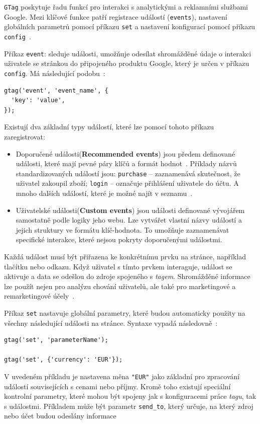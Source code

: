 \bigskip
\texttt{GTag} poskytuje řadu funkcí pro interakci s analytickými a reklamními službami Google. Mezi klíčové funkce patří registrace událostí (\texttt{events}), nastavení globálních parametrů pomocí příkazu \texttt{set} a nastavení konfigurací pomocí příkazu \texttt{config}~\cite{idGoogle}. 

\bigskip
Příkaz \texttt{event}: sleduje události, umožňuje odesílat shromážděné údaje o interakci uživatele se stránkou do připojeného produktu Google, který je určen v příkazu \texttt{config}. Má následující podobu~\cite{idGoogle}:
\begin{lstlisting}[caption=Event command]
gtag('event', 'event_name', {
  'key': 'value',
});
\end{lstlisting}

Existují dva základní typy událostí, které lze pomocí tohoto příkazu zaregistrovat:
\begin{itemize}
    \item Doporučené události(\textbf{Recommended events}) jsou předem definované události, které mají pevné páry klíčů a formát hodnot~\cite{idGoogle}. Příklady názvů standardizovaných událostí jsou: \texttt{purchase} -- zaznamenává skutečnost, že uživatel zakoupil zboží; \texttt{login} -- označuje přihlášení uživatele do účtu. A mnoho dalších událostí, které je možné najít v seznamu~\cite{listEvent}.
    \item Uživatelské události(\textbf{Custom events}) jsou události definované vývojářem samostatně podle logiky jeho webu. Lze vytvářet vlastní názvy událostí a jejich struktury ve formátu klíč-hodnota. To umožňuje zaznamenávat specifické interakce, které nejsou pokryty doporučenými událostmi.
\end{itemize}
 Každá událost musí být přiřazena ke konkrétnímu prvku na stránce, například tlačítku nebo odkazu. Když uživatel s tímto prvkem interaguje, událost se aktivuje a data se odešlou do zdroje spojeného s {\it tagem}. Shromážděné informace lze použít nejen pro analýzu chování uživatelů, ale také pro marketingové a remarketingové účely~\cite{idGoogle}.

\bigskip
Příkaz \texttt{set} nastavuje globální parametry, které budou automaticky použity na všechny následující události na stránce. Syntaxe vypadá následovně~\cite{idGoogle}:
\begin{lstlisting}[caption=Set command]
gtag('set', 'parameterName');

gtag('set', {'currency': 'EUR'});
\end{lstlisting}
V uvedeném příkladu je nastavena měna \texttt{"EUR"} jako základní pro zpracování událostí souvisejících s cenami nebo příjmy. Kromě toho existují speciální kontrolní parametry, které mohou být spojeny jak s konfiguracemi práce {\it tagu}, tak s událostmi. Příkladem může být parametr \texttt{send\_to}, který určuje, na který zdroj nebo účet budou odeslány informace~\cite{controlParam}

